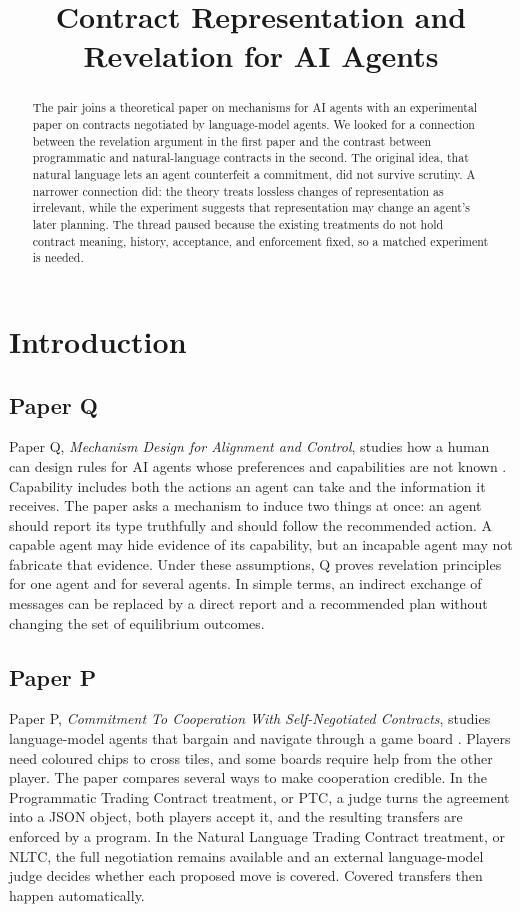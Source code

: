 \documentclass{article}
\title{Contract Representation and Revelation for AI Agents}
\author{}
\date{}
\begin{document}
\maketitle

\begin{abstract}
The pair joins a theoretical paper on mechanisms for AI agents with an experimental paper on contracts negotiated by language-model agents.  We looked for a connection between the revelation argument in the first paper and the contrast between programmatic and natural-language contracts in the second.  The original idea, that natural language lets an agent counterfeit a commitment, did not survive scrutiny.  A narrower connection did: the theory treats lossless changes of representation as irrelevant, while the experiment suggests that representation may change an agent's later planning.  The thread paused because the existing treatments do not hold contract meaning, history, acceptance, and enforcement fixed, so a matched experiment is needed.
\end{abstract}

\section{Introduction}

\subsection*{Paper Q}

Paper Q, \emph{Mechanism Design for Alignment and Control}, studies how a human can design rules for AI agents whose preferences and capabilities are not known \cite{Q}.  Capability includes both the actions an agent can take and the information it receives.  The paper asks a mechanism to induce two things at once: an agent should report its type truthfully and should follow the recommended action.  A capable agent may hide evidence of its capability, but an incapable agent may not fabricate that evidence.  Under these assumptions, Q proves revelation principles for one agent and for several agents.  In simple terms, an indirect exchange of messages can be replaced by a direct report and a recommended plan without changing the set of equilibrium outcomes.

\subsection*{Paper P}

Paper P, \emph{Commitment To Cooperation With Self-Negotiated Contracts}, studies language-model agents that bargain and navigate through a game board \cite{P}.  Players need coloured chips to cross tiles, and some boards require help from the other player.  The paper compares several ways to make cooperation credible.  In the Programmatic Trading Contract treatment, or PTC, a judge turns the agreement into a JSON object, both players accept it, and the resulting transfers are enforced by a program.  In the Natural Language Trading Contract treatment, or NLTC, the full negotiation remains available and an external language-model judge decides whether each proposed move is covered.  Covered transfers then happen automatically.
\end{document}

